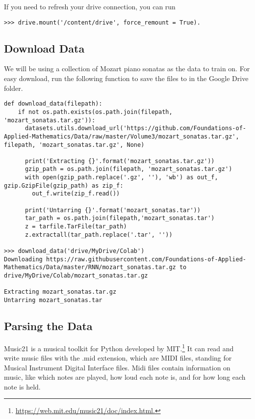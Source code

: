 If you need to refresh your drive connection, you can run
\begin{lstlisting}
>>> drive.mount('/content/drive', force_remount = True).
\end{lstlisting}


\subsection*{Download Data}
We will be using a collection of Mozart piano sonatas as the data to train on.
For easy download, run the following function to save the files to  in the Google Drive folder.


\begin{lstlisting}
def download_data(filepath):
    if not os.path.exists(os.path.join(filepath, 'mozart_sonatas.tar.gz')):
      datasets.utils.download_url('https://github.com/Foundations-of-Applied-Mathematics/Data/raw/master/Volume3/mozart_sonatas.tar.gz', filepath, 'mozart_sonatas.tar.gz', None)

      print('Extracting {}'.format('mozart_sonatas.tar.gz'))
      gzip_path = os.path.join(filepath, 'mozart_sonatas.tar.gz')
      with open(gzip_path.replace('.gz', ''), 'wb') as out_f, gzip.GzipFile(gzip_path) as zip_f:
        out_f.write(zip_f.read())

      print('Untarring {}'.format('mozart_sonatas.tar'))
      tar_path = os.path.join(filepath,'mozart_sonatas.tar')
      z = tarfile.TarFile(tar_path)
      z.extractall(tar_path.replace('.tar', ''))

>>> download_data('drive/MyDrive/Colab')
Downloading https://raw.githubusercontent.com/Foundations-of-Applied-Mathematics/Data/master/RNN/mozart_sonatas.tar.gz to drive/MyDrive/Colab/mozart_sonatas.tar.gz

Extracting mozart_sonatas.tar.gz
Untarring mozart_sonatas.tar
\end{lstlisting}

\vspace{5mm}
\subsection*{Parsing the Data}

Music21 is a musical toolkit for Python developed by MIT.\footnote{\url{https://web.mit.edu/music21/doc/index.html.}}
It can read and write music files with the .mid extension, which are MIDI files, standing for Musical Instrument Digital Interface files.
Midi files contain information on music, like which notes are played, how loud each note is, and for how long each note is held.

